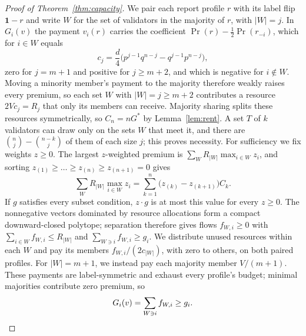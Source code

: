 \documentclass[sigconf,anonymous,review]{acmart}
\numberwithin{equation}{section}
\newcommand{\Gs}{G^{*}}
\begin{document}
\begin{proof}[Proof of Theorem~\ref{thm:capacity}]
We pair each report profile $r$ with its label flip $\mathbf1-r$ and write $W$
for the set of validators in the majority of $r$, with $|W|=j$. In $G_i(v)$ the
payment $v_i(r)$ carries the coefficient $\Pr(r)-\frac12\Pr(r_{-i})$, which for
$i\in W$ equals
\[
c_j=\frac d4\bigl(p^{j-1}q^{n-j}-q^{j-1}p^{n-j}\bigr),
\]
zero for $j=m+1$ and positive for $j\ge m+2$, and which is negative for
$i\notin W$. Moving a minority member's payment to the majority therefore
weakly raises every premium, so each set $W$ with $|W|=j\ge m+2$ contributes a
resource $2Vc_j=R_j$ that only its members can receive. Majority sharing
splits these resources symmetrically, so $C_n=n\Gs$ by Lemma~\ref{lem:rent}.
A set $T$ of $k$
validators can draw only on the sets $W$ that meet it, and there are
$\binom nj-\binom{n-k}{j}$ of them of each size $j$; this proves necessity. For
sufficiency we fix weights $z\ge0$. The largest $z$-weighted premium is
$\sum_WR_{|W|}\max_{i\in W}z_i$, and sorting
$z_{(1)}\ge\dots\ge z_{(n)}\ge z_{(n+1)}=0$ gives
\[
\sum_WR_{|W|}\max_{i\in W}z_i=\sum_{k=1}^{n}\bigl(z_{(k)}-z_{(k+1)}\bigr)C_k .
\]
If $g$ satisfies every subset condition, $z\cdot g$ is at most this value
for every $z\ge0$. The nonnegative vectors dominated by resource allocations
form a compact downward-closed polytope; separation therefore gives flows
$f_{W,i}\ge0$ with $\sum_{i\in W}f_{W,i}\le R_{|W|}$ and
$\sum_{W\ni i}f_{W,i}\ge g_i$. We distribute unused resources within each $W$
and pay its members $f_{W,i}/(2c_{|W|})$, with zero to others, on both paired
profiles. For $|W|=m+1$, we instead pay each majority member $V/(m+1)$.
These payments are label-symmetric and exhaust every profile's budget;
minimal majorities contribute zero premium, so
\[
G_i(v)=\sum_{W\ni i}f_{W,i}\ge g_i .\qedhere
\]
\end{proof}
\end{document}
